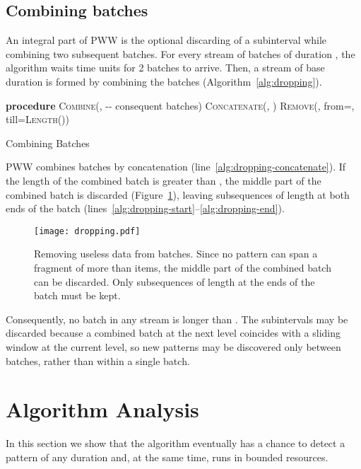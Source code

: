\documentclass[runningheads,a4paper]{llncs}
\begin{document}
\subsection{Combining batches}
\label{sec:combining-batches}

An integral part of PWW is the optional discarding of a subinterval while
combining two subsequent batches.  For every stream of batches of
duration , the algorithm waits  time units for 2 batches to
arrive.  Then, a stream of base duration  is formed by combining
the batches (Algorithm~\ref{alg:dropping}).
\begin{algorithm}
    \begin{algorithmic}[1]
    \STATE \textbf{procedure} \textsc{Combine}(,
         -{}- consequent batches)
    \STATE   \textsc{Concatenate}(, ) \label{alg:dropping-concatenate}
     \label{alg:dropping-start}
       \STATE \textsc{Remove}(, from=, till=\textsc{Length}())
    \ENDIF \label{alg:dropping-end}
	\RETURN 
\end{algorithmic}
\caption{Combining Batches}
\label{alg:dropping}
\end{algorithm}
PWW combines batches by concatenation
(line~\ref{alg:dropping-concatenate}). If the length of the combined
batch is greater than , the middle part of the combined
batch is discarded (Figure~\ref{fig:dropping}), leaving subsequences
of length  at both ends of the batch
(lines~\ref{alg:dropping-start}--\ref{alg:dropping-end}).
\begin{figure}
    \centering
	\texttt{[image: dropping.pdf]}
	\caption{Removing useless data from batches. Since no
    pattern can span a fragment of more than  items,
    the middle part of the combined batch can be discarded.
    Only subsequences of length  at the ends of the
    batch must be kept.}
    \label{fig:dropping}
\end{figure}
Consequently, no batch in any stream is longer than . The
subintervals may be discarded because a combined batch at the next level
coincides with a sliding window at the current level, so new patterns may be
discovered only between batches, rather than within a single batch.

\section{Algorithm Analysis}
\label{sec:analysis}

In this section we show that the algorithm eventually has a chance to
detect a pattern of any duration and, at the same time, runs in
bounded resources.
\end{document}
